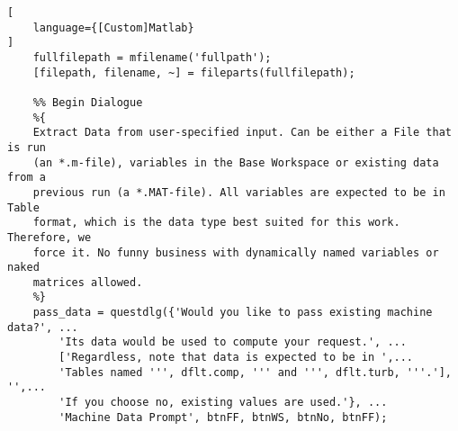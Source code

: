 \begin{lstlisting}[
    language={[Custom]Matlab}
]
    fullfilepath = mfilename('fullpath');
    [filepath, filename, ~] = fileparts(fullfilepath);

    %% Begin Dialogue
    %{
    Extract Data from user-specified input. Can be either a File that is run
    (an *.m-file), variables in the Base Workspace or existing data from a
    previous run (a *.MAT-file). All variables are expected to be in Table
    format, which is the data type best suited for this work. Therefore, we
    force it. No funny business with dynamically named variables or naked
    matrices allowed.
    %}
    pass_data = questdlg({'Would you like to pass existing machine data?', ...
        'Its data would be used to compute your request.', ...
        ['Regardless, note that data is expected to be in ',...
        'Tables named ''', dflt.comp, ''' and ''', dflt.turb, '''.'], '',...
        'If you choose no, existing values are used.'}, ...
        'Machine Data Prompt', btnFF, btnWS, btnNo, btnFF);


\end{lstlisting}
